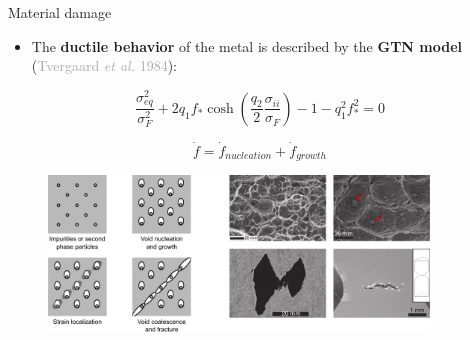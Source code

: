 \documentclass[9pt]{beamer}
\begin{document}

\begin{frame}{Material damage}

    \begin{itemize}
        \item The \textbf{ductile behavior} of the metal is described by the \textbf{GTN model} (\textcolor{darkgray}{Tvergaard \textit{et al.} 1984}):
     \end{itemize}

        $$ \displaystyle \frac{\sigma_{eq}^2}{\sigma_F^2} + 2 q_1 f_* \cosh \left(\frac{q_2}{2} \frac{\sigma_{ii}}{\sigma_F}\right) - 1 -q_1^2 f_*^2 = 0 $$ 

        \vspace{0.15cm}

        $$ \displaystyle \dot{f} = \dot{f}_{nucleation} + \dot{f}_{growth} $$

        \vspace{0.15cm}

        \begin{figure}
            \centering
            \includegraphics[width=0.9\textwidth]{Images/damage_evolution.pdf}
        \end{figure}
        
\end{frame}

\end{document}
